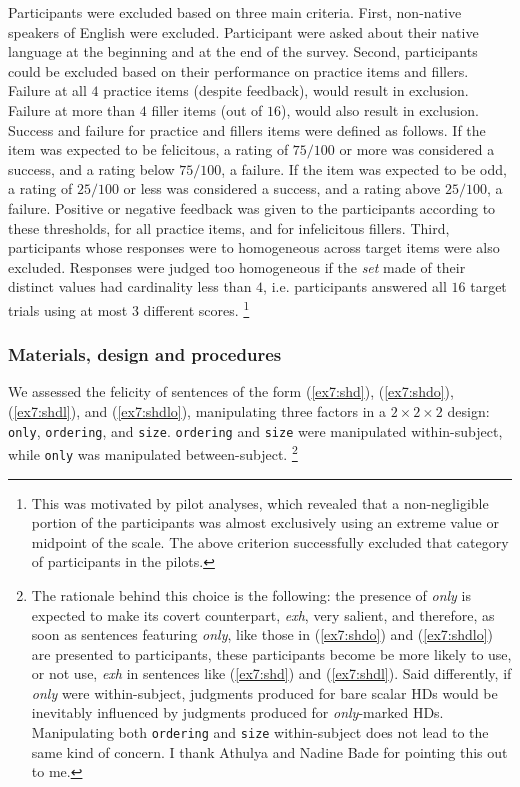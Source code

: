 Participants were excluded based on three main criteria. First, non-native speakers of English were excluded. Participant were asked about their native language at the beginning and at the end of the survey. Second, participants could be excluded based on their performance on practice items and fillers. Failure at all $4$ practice items (despite feedback), would result in exclusion. Failure at more than $4$ filler items (out of $16$), would also result in exclusion. Success and failure for practice and fillers items were defined as follows. If the item was expected to be felicitous, a rating of $75/100$ or more was considered a success, and a rating below $75/100$, a failure. If the item was expected to be odd, a rating of $25/100$ or less was considered a success, and a rating above $25/100$, a failure. Positive or negative feedback was given to the participants according to these thresholds, for all practice items, and for infelicitous fillers. Third, participants whose responses were to homogeneous across target items were also excluded. Responses were judged too homogeneous if the \textit{set} made of their distinct values had cardinality less than $4$, i.e. participants answered all $16$ target trials using at most $3$ different scores. \footnote{This was motivated by pilot analyses, which revealed that a non-negligible portion of the participants was almost exclusively using an extreme value or midpoint of the scale. The above criterion successfully excluded that category of participants in the pilots.}  %


\subsubsection{Materials, design and procedures}
We assessed the felicity of sentences of the form (\ref{ex7:shd}), (\ref{ex7:shdo}), (\ref{ex7:shdl}), and (\ref{ex7:shdlo}), manipulating three factors in  a $2\times2\times2$ design: \texttt{only}, \texttt{ordering}, and \texttt{size}. \texttt{ordering} and \texttt{size} were manipulated within-subject, while \texttt{only} was manipulated between-subject. \footnote{The rationale behind this choice is the following: the presence of \textit{only} is expected to make its covert counterpart, \textit{exh}, very salient, and therefore, as soon as sentences featuring \textit{only}, like those in (\ref{ex7:shdo}) and (\ref{ex7:shdlo}) are presented to participants, these participants become be more likely to use, or not use, \textit{exh} in sentences like (\ref{ex7:shd}) and  (\ref{ex7:shdl}). Said differently, if \textit{only} were within-subject, judgments produced for bare scalar HDs would be inevitably influenced by judgments produced for \textit{only}-marked HDs. Manipulating both \texttt{ordering} and \texttt{size} within-subject does not lead to the same kind of concern. I thank Athulya and Nadine Bade for pointing this out to me.}\\


